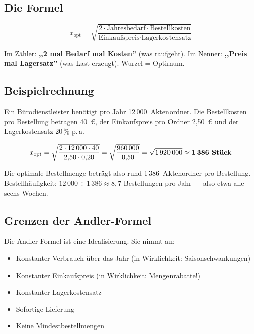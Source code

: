\documentclass[11pt, a4paper]{article}
\begin{document}
\subsection{Die Formel}

\begin{merksatz}[title={Andler-Formel}]
\[
x_{\text{opt}} = \sqrt{\frac{2 \cdot \text{Jahresbedarf} \cdot \text{Bestellkosten}}{\text{Einkaufspreis} \cdot \text{Lagerkostensatz}}}
\]
\end{merksatz}

\begin{eselsbruecke}
Im Zähler: \textbf{,,2 mal Bedarf mal Kosten''} (was raufgeht). Im Nenner:
\textbf{,,Preis mal Lagersatz''} (was Last erzeugt). Wurzel = Optimum.
\end{eselsbruecke}

\subsection{Beispielrechnung}

\begin{beispiel}
Ein Bürodienstleister benötigt pro Jahr 12\,000~Aktenordner. Die Bestellkosten pro
Bestellung betragen 40~€, der Einkaufspreis pro Ordner 2,50~€ und der Lagerkostensatz
20\,\% p.\,a.

\medskip
\[
x_{\text{opt}} = \sqrt{\frac{2 \cdot 12\,000 \cdot 40}{2{,}50 \cdot 0{,}20}}
= \sqrt{\frac{960\,000}{0{,}50}}
= \sqrt{1\,920\,000}
\approx \textbf{1\,386 Stück}
\]

\medskip
Die optimale Bestellmenge beträgt also rund 1\,386~Aktenordner pro Bestellung.
Bestellhäufigkeit: $12\,000 \div 1\,386 \approx 8{,}7$ Bestellungen pro Jahr ---
also etwa alle sechs Wochen.
\end{beispiel}

\subsection{Grenzen der Andler-Formel}

Die Andler-Formel ist eine Idealisierung. Sie nimmt an:

\begin{itemize}[itemsep=0pt]
  \item Konstanter Verbrauch über das Jahr (in Wirklichkeit: Saisonschwankungen)
  \item Konstanter Einkaufspreis (in Wirklichkeit: Mengenrabatte!)
  \item Konstanter Lagerkostensatz
  \item Sofortige Lieferung
  \item Keine Mindestbestellmengen
\end{itemize}
\end{document}
